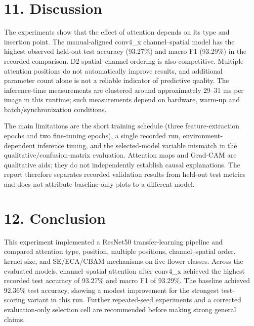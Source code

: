 \documentclass[10pt]{article}
\begin{document}
\section*{11. Discussion}
The experiments show that the effect of attention depends on its type and insertion point. The manual-aligned conv4\_x channel--spatial model has the highest observed held-out test accuracy (93.27\%) and macro F1 (93.29\%) in the recorded comparison. D2 spatial--channel ordering is also competitive. Multiple attention positions do not automatically improve results, and additional parameter count alone is not a reliable indicator of predictive quality. The inference-time measurements are clustered around approximately 29--31 ms per image in this runtime; such measurements depend on hardware, warm-up and batch/synchronization conditions.

The main limitations are the short training schedule (three feature-extraction epochs and two fine-tuning epochs), a single recorded run, environment-dependent inference timing, and the selected-model variable mismatch in the qualitative/confusion-matrix evaluation. Attention maps and Grad-CAM are qualitative aids; they do not independently establish causal explanations. The report therefore separates recorded validation results from held-out test metrics and does not attribute baseline-only plots to a different model.

\section*{12. Conclusion}
This experiment implemented a ResNet50 transfer-learning pipeline and compared attention type, position, multiple positions, channel--spatial order, kernel size, and SE/ECA/CBAM mechanisms on five flower classes. Across the evaluated models, channel--spatial attention after conv4\_x achieved the highest recorded test accuracy of 93.27\% and macro F1 of 93.29\%. The baseline achieved 92.36\% test accuracy, showing a modest improvement for the strongest test-scoring variant in this run. Further repeated-seed experiments and a corrected evaluation-only selection cell are recommended before making strong general claims.
\end{document}
